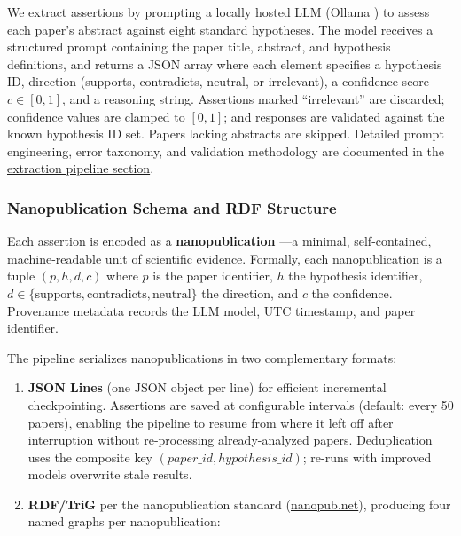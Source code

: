 \documentclass[
  english,
]{article}
\begin{document}
We extract assertions by prompting a locally hosted LLM (Ollama
\citep{ollama2024}) to assess each paper's abstract against eight
standard hypotheses. The model receives a structured prompt containing
the paper title, abstract, and hypothesis definitions, and returns a
JSON array where each element specifies a hypothesis ID, direction
(supports, contradicts, neutral, or irrelevant), a confidence score
\(c \in [0, 1]\), and a reasoning string. Assertions marked
``irrelevant'' are discarded; confidence values are clamped to
\([0, 1]\); and responses are validated against the known hypothesis ID
set. Papers lacking abstracts are skipped. Detailed prompt engineering,
error taxonomy, and validation methodology are documented in the
\hyperref[sec:extraction_pipeline]{extraction pipeline section}.

\subsubsection{Nanopublication Schema and RDF
Structure}\label{nanopublication-schema-and-rdf-structure}

Each assertion is encoded as a \textbf{nanopublication}
\citep{groth2010anatomy, kuhn2016decentralized}---a minimal,
self-contained, machine-readable unit of scientific evidence. Formally,
each nanopublication is a tuple \((p, h, d, c)\) where \(p\) is the
paper identifier, \(h\) the hypothesis identifier,
\(d \in \{\text{supports}, \text{contradicts}, \text{neutral}\}\) the
direction, and \(c\) the confidence. Provenance metadata records the LLM
model, UTC timestamp, and paper identifier.

The pipeline serializes nanopublications in two complementary formats:

\begin{enumerate}
\def\labelenumi{\arabic{enumi}.}
\item
  \textbf{JSON Lines} (one JSON object per line) for efficient
  incremental checkpointing. Assertions are saved at configurable
  intervals (default: every 50 papers), enabling the pipeline to resume
  from where it left off after interruption without re-processing
  already-analyzed papers. Deduplication uses the composite key
  \((paper\_id, hypothesis\_id)\); re-runs with improved models
  overwrite stale results.
\item
  \textbf{RDF/TriG} per the nanopublication standard
  (\href{https://nanopub.net/}{nanopub.net}), producing four named
  graphs per nanopublication:
\end{enumerate}
\end{document}
